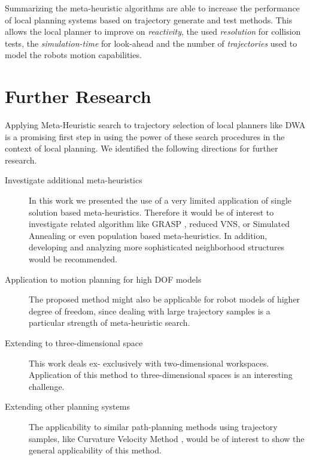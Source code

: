 Summarizing the meta-heuristic algorithms are able to increase the performance of local planning systems based on trajectory generate and test methods. This allows the local planner to improve on \emph{reactivity}, the used \emph{resolution} for collision tests, the \emph{simulation-time} for look-ahead and the number of \emph{trajectories} used to model the robots motion capabilities.

\section{Further Research}
Applying Meta-Heuristic search to trajectory selection of local planners like DWA is a promising first step in using the power of these search procedures in the context of local planning. 
We identified the following directions for further research.

\begin{description}
\item[Investigate additional meta-heuristics] In this work we presented the use of a very limited application of single solution based meta-heuristics. Therefore it would be of interest to investigate related algorithm like GRASP \cite{feo1995grasp}, reduced VNS, or Simulated Annealing \cite{Kirkpatrick83SimulatedAnnealing} or even population based meta-heuristics.
In addition, developing and analyzing more sophisticated neighborhood structures would be recommended. 

\item[Application to motion planning for high DOF models] The proposed method might also be applicable for robot models of higher degree of freedom, since dealing with large trajectory samples is a particular strength of meta-heuristic search.

\item[Extending to three-dimensional space] This work deals ex-
exclusively with two-dimensional workspaces. Application of this method to three-dimensional spaces is an interesting challenge. 

\item[Extending other planning systems] The applicability to similar path-planning methods using trajectory samples, like Curvature Velocity Method \cite{simmons1996curvature}, would be of interest to show the general applicability of this method. 

\end{description}
